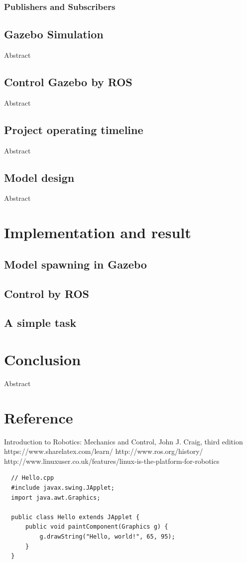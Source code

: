 \documentclass[pdftex,12pt,a4paper]{article}
\begin{document}
  
  \newpage
  \subsubsection{Publishers and Subscribers}
  
  \newpage
  \subsection{Gazebo Simulation}
  Abstract
  
  \newpage
  \subsection{Control Gazebo by ROS}
  Abstract

  \newpage
  \subsection{Project operating timeline}
  Abstract
  
  \newpage
  \subsection{Model design}
  Abstract
  
  \newpage
  \section{Implementation and result}
  \subsection{Model spawning in Gazebo}
  \subsection{Control by ROS}
  \subsection{A simple task}
    
  \newpage
  \section{Conclusion}
  Abstract
  
  \newpage
  \section{Reference}
  Introduction to Robotics: Mechanics and Control, John J. Craig, third edition
  https://www.sharelatex.com/learn/
  http://www.ros.org/history/
  http://www.linuxuser.co.uk/features/linux-is-the-platform-for-robotics
  \begin{lstlisting}
  // Hello.cpp
  #include javax.swing.JApplet;
  import java.awt.Graphics;
  
  public class Hello extends JApplet {
	  public void paintComponent(Graphics g) {
          g.drawString("Hello, world!", 65, 95);
      }    
  }
  \end{lstlisting}
  
\end{document}
